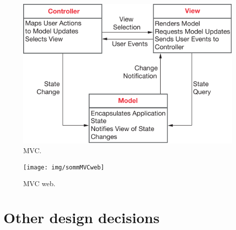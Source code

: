 \begin{figure}%
	\centering%
	\includegraphics{img/sommMVC}%
	\caption{MVC.}
\end{figure}

\begin{figure}%
	\centering%
	\texttt{[image: img/sommMVCweb]}%
	\caption{MVC web.}
\end{figure}






\clearpage%
\section{Other design decisions}\label{sec:decisions}
\lipsum[1-2]
